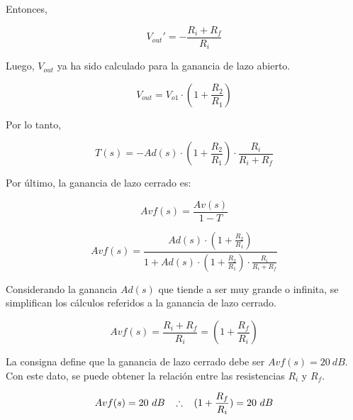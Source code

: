 \documentclass[12pt,A4paper,titlepage]{article}
\begin{document}
\hspace{1mm} Entonces,

\begin{equation}
    V_{out}'= -\frac{R_i+R_f}{R_i}
\end{equation}

\bigskip
\hspace{1mm} Luego, \(V_{out}\) ya ha sido calculado para la ganancia de lazo abierto.

\begin{equation}
    V_{out}= V_{o1}\cdot (1+\frac{R_2}{R_1})
\end{equation}

\hspace{1mm} Por lo tanto, 

\begin{equation}
    \boxed{
      T(s) = -Ad(s)\cdot (1+\frac{R_2}{R_1})\cdot \frac{R_i}{R_i+R_f}
    }
\end{equation}

\bigskip
\hspace{1mm} Por último, la ganancia de lazo cerrado es:

\begin{equation}
    Avf(s) = \frac{Av(s)}{1-T}
\end{equation}

\begin{equation}
      Avf(s) = \frac{Ad(s)\cdot (1+\frac{R_2}{R_1})}{1+Ad(s)\cdot (1+\frac{R_2}{R_1})\cdot \frac{R_i}{R_i+R_f}}
\end{equation}

\bigskip
\hspace{1mm} Considerando la ganancia \(Ad(s)\) que tiende a ser muy grande o infinita, se simplifican los cálculos referidos a la ganancia de lazo cerrado.

\bigskip
\begin{equation}
    \boxed{
        Avf(s)=\frac{R_i+R_f}{R_i}=(1+\frac{R_f}{R_i}) 
    }
\end{equation}

\bigskip
\hspace{1mm} La consigna define que la ganancia de lazo cerrado debe ser \(Avf(s)=20~dB\). Con este dato, se puede obtener la relación entre las resistencias \(R_i\) y \(R_f\).

\begin{equation}
    Avf(s)=20~dB \hspace{3mm} \therefore \hspace{3mm} (1+\frac{R_f}{R_i})=20~dB
\end{equation}
\end{document}
